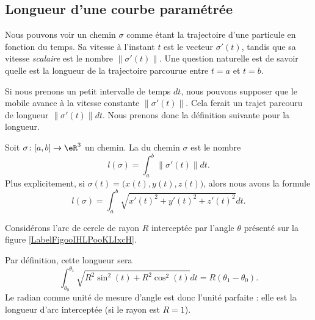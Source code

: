 \subsection{Longueur d'une courbe paramétrée}

Nous pouvons voir un chemin $\sigma$ comme étant la trajectoire d'une particule en fonction du temps. Sa vitesse à l'instant $t$ est le vecteur $\sigma'(t)$, tandis que sa vitesse \emph{scalaire} est le nombre $\| \sigma'(t) \|$. Une question naturelle est de savoir quelle est la longueur de la trajectoire parcourue entre $t=a$ et $t=b$.

Si nous prenons un petit intervalle de temps $dt$, nous pouvons supposer que le mobile avance à la vitesse constante $\| \sigma'(t) \|$. Cela ferait un trajet parcouru de longueur $\| \sigma'(t) \|dt$. Nous prenons donc la définition suivante pour la longueur.

\begin{definition}
    Soit $\sigma\colon \mathopen[ a , b \mathclose]\to \eR^3$ un chemin. La  du chemin $\sigma$ est le nombre
    \begin{equation}        \label{EqDefLongueurCheminOM}
        l(\sigma)=\int_a^b\| \sigma'(t) \|dt.
    \end{equation}
    Plus explicitement, si $\sigma(t)=\big( x(t),y(t),z(t) \big)$, alors nous avons la formule
    \begin{equation}
        l(\sigma)=\int_a^b\sqrt{x'(t)^2+y'(t)^2+z'(t)^2}dt.
    \end{equation}
\end{definition}

\begin{example}
    Considérons l'arc de cercle de rayon $R$ interceptée par l'angle $\theta$ présenté sur la figure \ref{LabelFigooIHLPooKLIxcH}.
    \newcommand{\CaptionFigooIHLPooKLIxcH}{Quelle est la longueur de la partie bleue de ce cercle de rayon $R$ ?}
    

    Par définition, cette longueur sera
    \begin{equation}
        \int_{\theta_0}^{\theta_1}\sqrt{R^2\sin^2(t)+R^2\cos^2(t)}dt=R(\theta_1-\theta_0).
    \end{equation}
    Le radian comme unité de mesure d'angle est donc l'unité parfaite : elle est la longueur d'arc interceptée (si le rayon est $R=1$).

\end{example}

